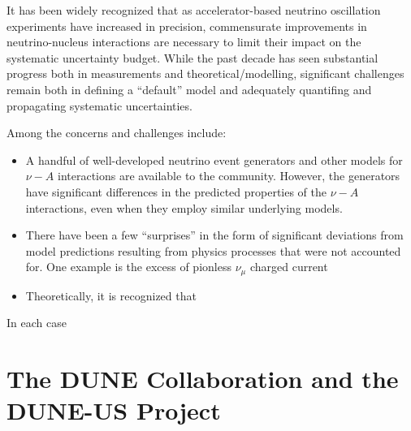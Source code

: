 It has been widely recognized that as accelerator-based neutrino oscillation experiments have increased in precision, commensurate improvements in neutrino-nucleus interactions are necessary to limit their impact on the systematic uncertainty budget. While the past decade has seen substantial progress both in measurements and theoretical/modelling, significant challenges remain both in defining a ``default'' model and adequately quantifing and propagating systematic uncertainties.

Among the concerns and challenges include:
\begin{itemize}
\item A handful of well-developed neutrino event generators and other models for $\nu-A$ interactions are available to the community. However, the generators have significant differences in the predicted properties of the $\nu-A$ interactions, even when they employ similar underlying models.
\item There have been a few ``surprises'' in the form of significant deviations from model predictions resulting from physics processes that were not accounted for. One example is the excess of pionless $\nu_\mu$ charged current 
\item Theoretically, it is recognized that 

\end{itemize}

In each case




\section{The DUNE Collaboration and the DUNE-US Project}
\label{intro:collab-proj}


